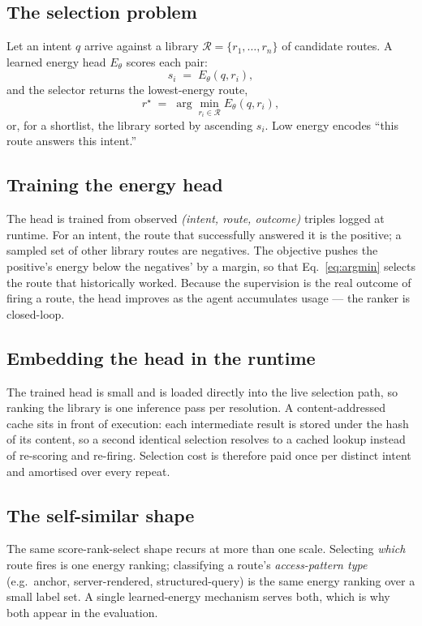 \documentclass[11pt]{article}
\begin{document}
\subsection{The selection problem}
Let an intent $q$ arrive against a library $\mathcal{R} = \{r_1, \dots, r_n\}$ of
candidate routes. A learned energy head $E_\theta$ scores each pair:
\begin{equation}
  s_i \;=\; E_\theta(q, r_i), \label{eq:energy}
\end{equation}
and the selector returns the lowest-energy route,
\begin{equation}
  r^\star \;=\; \arg\min_{r_i \in \mathcal{R}} E_\theta(q, r_i), \label{eq:argmin}
\end{equation}
or, for a shortlist, the library sorted by ascending $s_i$. Low energy encodes
``this route answers this intent.''

\subsection{Training the energy head}
The head is trained from observed \emph{(intent, route, outcome)} triples logged at
runtime. For an intent, the route that successfully answered it is the positive; a
sampled set of other library routes are negatives. The objective pushes the
positive's energy below the negatives' by a margin, so that
Eq.~\eqref{eq:argmin} selects the route that historically worked. Because the
supervision is the real outcome of firing a route, the head improves as the agent
accumulates usage --- the ranker is closed-loop.

\subsection{Embedding the head in the runtime}
The trained head is small and is loaded directly into the live selection path, so
ranking the library is one inference pass per resolution. A content-addressed cache
sits in front of execution: each intermediate result is stored under the hash of
its content, so a second identical selection resolves to a cached lookup instead of
re-scoring and re-firing. Selection cost is therefore paid once per distinct intent
and amortised over every repeat.

\subsection{The self-similar shape}
The same score-rank-select shape recurs at more than one scale. Selecting
\emph{which} route fires is one energy ranking; classifying a route's
\emph{access-pattern type} (e.g.\ anchor, server-rendered, structured-query) is the
same energy ranking over a small label set. A single learned-energy mechanism
serves both, which is why both appear in the evaluation.
\end{document}
